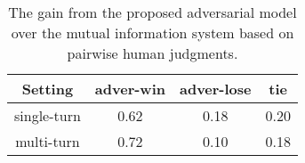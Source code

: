 \documentclass[11pt]{article}
\begin{document}
\begin{table}
\small
\centering
\begin{tabular}{cccc}\\\hline
Setting &adver-win &adver-lose &tie\\\hline
single-turn& 0.62& 0.18 &0.20 \\
multi-turn& 0.72 &0.10& 0.18\\\hline
\end{tabular}
\caption{The gain
from the proposed adversarial model
 over the mutual information system
based on pairwise human judgments.}
\label{human}
\end{table}

\begin{comment}
\begin{table}
\centering
\small
\begin{tabular}{l}\hline
{\bf Input}: {Do you love me?} (1) \\\hline
{\it Mutual information reranking} \\ 
{Yes, of course}. (2)\\
 {I love you too.} (3)\\
{Goodbye, honey}. (4) \\\hline
{\it Adversarial training} \\
More than anything in this world. (2) \\
Then we can stay together, you and me. (3) \\
Yes, we can. (4) \\\hline
{\bf Input}: {Where are you going?} (1) \\\hline
{\it Mutual information reranking} \\ 
I am going to the restroom. (2) \\
See you later. (3) \\
See you later. (4)\\\hline
{\it Adversarial training} \\
I'm going to join the Army. (2)\\
 You're joking! (3)\\
 No I'm not. (4)\\\hline
\end{tabular}	
\caption{
Multi-turn dialogue simulation. The first turn (index 1) is input by the authors. Then the two agents take turns conversing, taking as input the other agent's prior generated turn.}
\label{multi}
\end{table}
\end{comment}
\end{document}
